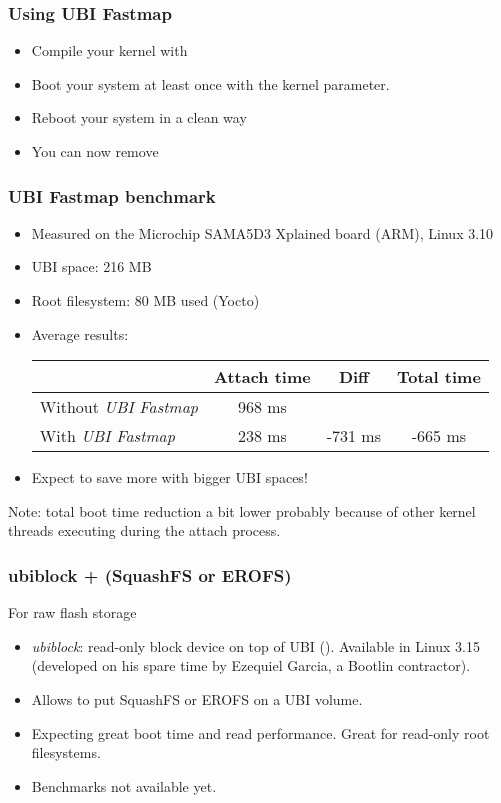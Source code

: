 \begin{frame}
\frametitle{Using UBI Fastmap}
\begin{itemize}
\item Compile your kernel with 
\item Boot your system at least once with the
       kernel parameter.
\item Reboot your system in a clean way
\item You can now remove 
\end{itemize}
\end{frame}

\begin{frame}
\frametitle{UBI Fastmap benchmark}
\begin{itemize}
\item Measured on the Microchip SAMA5D3 Xplained board (ARM), Linux 3.10
\item UBI space: 216 MB
\item Root filesystem: 80 MB used (Yocto)
\item Average results:
    \newline \newline
    \begin{tabular}{| l || c | c | c |}
    \hline
    & Attach time & Diff & Total time\\
    \hline
    Without {\em UBI Fastmap} & 968 ms & & \\
    With {\em UBI Fastmap} & 238 ms & -731 ms & -665 ms \\
    \hline
    \end{tabular}
    \newline
\item Expect to save more with bigger UBI spaces!
\end{itemize}
Note: total boot time reduction a bit lower probably
because of other kernel threads executing during the
attach process.
\end{frame}

\begin{frame}
\frametitle{ubiblock + (SquashFS or EROFS)}
For raw flash storage
\begin{itemize}
\item {\em ubiblock}: read-only block device on top of UBI
      (). Available in Linux 3.15
      (developed on his spare time by Ezequiel Garcia,
      a Bootlin contractor).
\item Allows to put SquashFS or EROFS on a UBI volume.
\item Expecting great boot time and read performance. Great
      for read-only root filesystems.
\item Benchmarks not available yet.
\end{itemize}
\end{frame}

